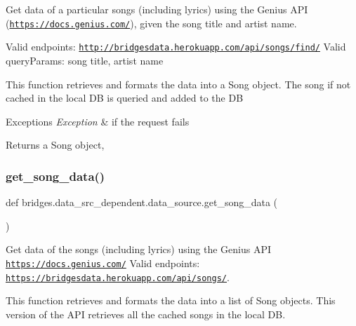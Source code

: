 Get data of a particular songs (including lyrics) using the Genius A\+PI (\href{https://docs.genius.com/}{\tt https\+://docs.\+genius.\+com/}), given the song title and artist name. 

Valid endpoints\+: \href{http://bridgesdata.herokuapp.com/api/songs/find/}{\tt http\+://bridgesdata.\+herokuapp.\+com/api/songs/find/} Valid query\+Params\+: song title, artist name

This function retrieves and formats the data into a Song object. The song if not cached in the local DB is queried and added to the DB


\begin{DoxyExceptions}{Exceptions}
{\em Exception} & if the request fails\\
\hline
\end{DoxyExceptions}
\begin{DoxyReturn}{Returns}
a Song object, 
\end{DoxyReturn}
\mbox{\label{namespacebridges_1_1data__src__dependent_1_1data__source_abf7f1f53dc13383fa296cb597e4a7ee0}} 
\subsubsection{\texorpdfstring{get\+\_\+song\+\_\+data()}{get\_song\_data()}}
{\footnotesize\ttfamily def bridges.\+data\+\_\+src\+\_\+dependent.\+data\+\_\+source.\+get\+\_\+song\+\_\+data (\begin{DoxyParamCaption}{ }\end{DoxyParamCaption})}



Get data of the songs (including lyrics) using the Genius A\+PI \href{https://docs.genius.com/}{\tt https\+://docs.\+genius.\+com/} Valid endpoints\+: \href{https://bridgesdata.herokuapp.com/api/songs/}{\tt https\+://bridgesdata.\+herokuapp.\+com/api/songs/}. 

This function retrieves and formats the data into a list of Song objects. This version of the A\+PI retrieves all the cached songs in the local DB.


